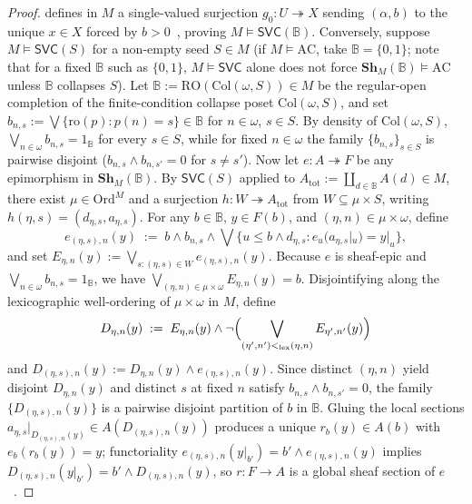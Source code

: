 \begin{proof}
defines in $M$ a single-valued surjection $g_0 : U \twoheadrightarrow X$ sending $(\alpha, b)$ to the unique $x \in X$ forced by $b > 0$~\cite[Theorem~4.2]{Blass79}, proving $M \models \mathsf{SVC}(\mathbb{B})$. Conversely, suppose $M \models \mathsf{SVC}(S)$ for a non-empty seed $S \in M$ (if $M \models \mathrm{AC}$, take $\mathbb{B} = \{0,1\}$; note that for a fixed $\mathbb{B}$ such as $\{0,1\}$, $M \models \mathsf{SVC}$ alone does not force $\mathbf{Sh}_M(\mathbb{B}) \models \mathrm{AC}$ unless $\mathbb{B}$ collapses $S$). Let $\mathbb{B} := \mathrm{RO}(\mathrm{Col}(\omega, S)) \in M$ be the regular-open completion of the finite-condition collapse poset $\mathrm{Col}(\omega, S)$, and set $b_{n,s} := \bigvee \{\mathrm{ro}(p) : p(n) = s\} \in \mathbb{B}$ for $n \in \omega$, $s \in S$. By density of $\mathrm{Col}(\omega, S)$, $\bigvee_{n \in \omega} b_{n,s} = 1_{\mathbb{B}}$ for every $s \in S$, while for fixed $n \in \omega$ the family $\{b_{n,s}\}_{s \in S}$ is pairwise disjoint ($b_{n,s} \wedge b_{n,s'} = 0$ for $s \neq s'$). Now let $e : A \twoheadrightarrow F$ be any epimorphism in $\mathbf{Sh}_M(\mathbb{B})$. By $\mathsf{SVC}(S)$ applied to $A_{\mathrm{tot}} := \coprod_{d \in \mathbb{B}} A(d) \in M$, there exist $\mu \in \mathrm{Ord}^M$ and a surjection $h : W \twoheadrightarrow A_{\mathrm{tot}}$ from $W \subseteq \mu \times S$, writing $h(\eta, s) = (d_{\eta, s}, a_{\eta, s})$. For any $b \in \mathbb{B}$, $y \in F(b)$, and $(\eta, n) \in \mu \times \omega$, define
\[
  e_{(\eta, s), n}(y) \;:=\; b \wedge b_{n,s} \wedge \bigvee\bigl\{u \le b \wedge d_{\eta,s} : e_u(a_{\eta,s}|_u) = y|_u\bigr\},
\]
and set $E_{\eta, n}(y) := \bigvee_{s : (\eta, s) \in W} e_{(\eta, s), n}(y)$. Because $e$ is sheaf-epic and $\bigvee_{n \in \omega} b_{n,s} = 1_{\mathbb{B}}$, we have $\bigvee_{(\eta, n) \in \mu \times \omega} E_{\eta, n}(y) = b$. Disjointifying along the lexicographic well-ordering of $\mu \times \omega$ in $M$, define
\[
  D_{\eta, n}(y) \;:=\; E_{\eta, n}(y) \wedge \neg\Bigl(\bigvee_{(\eta', n') <_{\mathrm{lex}} (\eta, n)} E_{\eta', n'}(y)\Bigr)
\]
and $D_{(\eta, s), n}(y) := D_{\eta, n}(y) \wedge e_{(\eta, s), n}(y)$. Since distinct $(\eta, n)$ yield disjoint $D_{\eta, n}(y)$ and distinct $s$ at fixed $n$ satisfy $b_{n,s} \wedge b_{n,s'} = 0$, the family $\{D_{(\eta,s), n}(y)\}$ is a pairwise disjoint partition of $b$ in $\mathbb{B}$. Gluing the local sections $a_{\eta, s}|_{D_{(\eta, s), n}(y)} \in A(D_{(\eta, s), n}(y))$ produces a unique $r_b(y) \in A(b)$ with $e_b(r_b(y)) = y$; functoriality $e_{(\eta, s), n}(y|_{b'}) = b' \wedge e_{(\eta, s), n}(y)$ implies $D_{(\eta, s), n}(y|_{b'}) = b' \wedge D_{(\eta, s), n}(y)$, so $r : F \to A$ is a global sheaf section of $e$~\cite{Blass79,Usuba21}.
\end{proof}

